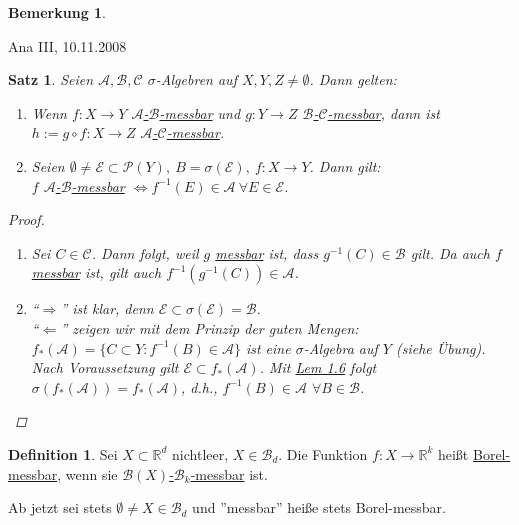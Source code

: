 \documentclass[a4paper]{scrreprt}
\newcommand{\PowerSet}{\mathcal{P}}
\newcommand{\R}{\mathbb{R}}
\newcommand{\Borel}{\mathcal{B}}
\newcommand{\Bd}{\Borel_d}
\newcommand{\jlabel}[1]{\label{j_#1}}
\newcommand{\jhyperref}[2]{\hyperref[j_#1]{#2}}
\newcommand{\jlink}[1]{\jhyperref{#1}{#1}}
\newcommand{\mb}[2]{\jhyperref{messbar}{#1-#2-messbar}}
\newcommand{\calMb}[2]{\mb{$\mathcal{#1}$}{$\mathcal{#2}$}}
\newcommand{\jabb}[3]{ #1: #2 \rightarrow #3 }
\newcommand{\jsigalg}{$\sigma$-Algebra}
\newcommand{\jspacesmall}{\vspace{4pt}}
\newcommand{\jdate}[1]{\jspacesmall\begin{center}\jlabel{#1}\tiny{Ana III, #1}\end{center}}
\theoremstyle{plain}
\newtheorem{satz}[thm]{Satz}
\theoremstyle{definition}
\newtheorem{defn}[thm]{Definition}
\newtheorem{bem}[thm]{Bemerkung}
\begin{document}
{{{\begin{bem}
\begin{enumerate}
        
    \end{enumerate}
\end{bem}

\jdate{10.11.2008}

\begin{satz}
\jlabel{Satz 2.3}
    Seien $\mathcal{A}, \Borel, \mathcal{C}$ $\sigma$-Algebren auf $X,Y,Z \ne \emptyset$. Dann gelten:
    \begin{enumerate}
        \item Wenn $\jabb{f}{X}{Y}$ \calMb{A}{B} und $\jabb{g}{Y}{Z}$ \calMb{B}{C}, dann ist $\jabb{h:= g \circ f}{X}{Z}$ \calMb{A}{C}.
        \item Seien $\emptyset \ne \mathcal{E} \subset \PowerSet(Y), \ B = \sigma(\mathcal{E}),\ \jabb{f}{X}{Y}$. Dann gilt:\\
        $f$ \calMb{A}{B} $\Leftrightarrow f^{-1}(E) \in \mathcal{A} \ \forall E \in \mathcal{E}$.
    \end{enumerate}
    \begin{proof}
        \begin{enumerate}
            \item 
                Sei $C\in \mathcal{C}$. Dann folgt, weil $g$ \jlink{messbar} ist, dass $g^{-1}(C)\in \Borel$ gilt. Da auch $f$ \jlink{messbar} ist, gilt auch $f^{-1}(g^{-1}(C))\in \mathcal{A}$.
            \item
                ``$\Rightarrow$'' ist klar, denn $\mathcal{E}\subset \sigma(\mathcal{E}) = \Borel$.\\
                ``$\Leftarrow$'' zeigen wir mit dem Prinzip der guten Mengen:\\
                $f_*(\mathcal{A}) = \{C\subset Y : f^{-1}(B) \in \mathcal{A}\}$ ist eine \jsigalg{} auf $Y$ (siehe Übung). Nach Voraussetzung gilt $\mathcal{E} \subset f_*(\mathcal{A})$. Mit \jlink{Lem 1.6} folgt $\sigma(f_*(\mathcal{A})) = f_*(\mathcal{A})$, d.h., $f^{-1}(B)\in \mathcal{A}$ $\forall B\in \Borel$.
        \end{enumerate}
    \end{proof}
\end{satz}

\begin{defn}
\jlabel{Def 2.4}
    Sei $X \subset \R^d$ nichtleer, $X\in \Bd$. Die Funktion $\jabb{f}{X}{\R^k}$ heißt \uline{Borel-messbar}, wenn sie \mb{$\Borel(X)$}{$\Borel_k$} ist.
\end{defn}
Ab jetzt sei stets $\emptyset \ne X \in \Bd$ und ''messbar'' heiße stets Borel-messbar.

}}}
\end{document}
